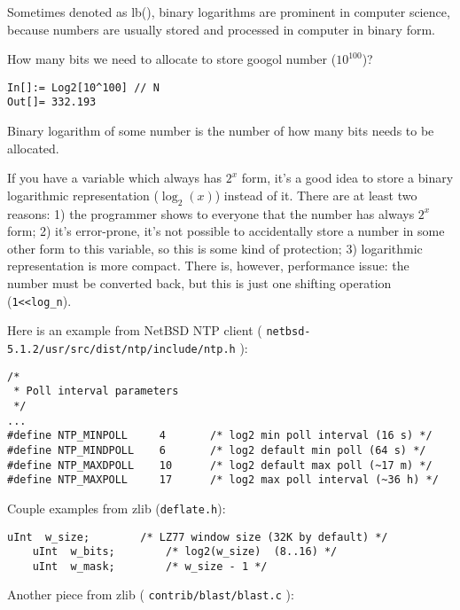
Sometimes denoted as lb(), binary logarithms are prominent in computer science, 
because numbers are usually stored and processed in computer in binary form.

\leveldown{}


How many bits we need to allocate to store googol number ($10^{100}$)?

\begin{lstlisting}[caption=Wolfram Mathematica]
In[]:= Log2[10^100] // N
Out[]= 332.193
\end{lstlisting}

Binary logarithm of some number is the number of how many bits needs to be allocated.

If you have a variable which always has $2^x$ form, it's a good idea to store a binary logarithmic representation ($\log_2 (x)$) instead of it.
There are at least two reasons:
1) the programmer shows to everyone that the number has always $2^x$ form;
2) it's error-prone, it's not possible to accidentally store a number in some other form to this variable, so this is some kind of protection;
3) logarithmic representation is more compact.
There is, however, performance issue: the number must be converted back, but this is just one shifting operation (\texttt{1<<log\_n}).

Here is an example from NetBSD NTP client ( \texttt{netbsd-5.1.2/usr/src/dist/ntp/include/ntp.h} ):

\begin{lstlisting}[caption=C code,style=customc]
/*
 * Poll interval parameters
 */
...
#define NTP_MINPOLL     4       /* log2 min poll interval (16 s) */
#define NTP_MINDPOLL    6       /* log2 default min poll (64 s) */
#define NTP_MAXDPOLL    10      /* log2 default max poll (~17 m) */
#define NTP_MAXPOLL     17      /* log2 max poll interval (~36 h) */
\end{lstlisting}

Couple examples from zlib (\texttt{deflate.h}):

\begin{lstlisting}[caption=C code,style=customc]
    uInt  w_size;        /* LZ77 window size (32K by default) */
    uInt  w_bits;        /* log2(w_size)  (8..16) */
    uInt  w_mask;        /* w_size - 1 */
\end{lstlisting}

Another piece from zlib ( \texttt{contrib/blast/blast.c} ):

